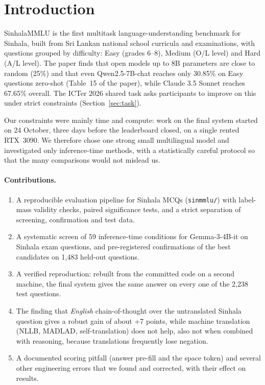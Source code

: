\documentclass[10pt,a4paper]{article}
\begin{document}
\tableofcontents
\newpage

\section{Introduction}
SinhalaMMLU \cite{pramodya2025} is the first multitask language-understanding benchmark for Sinhala, built from Sri
Lankan national school curricula and examinations, with questions grouped by difficulty: Easy (grades 6--8),
Medium (O/L level) and Hard (A/L level). The paper finds that open models up to 8B parameters are close to random
(25\%) and that even Qwen2.5-7B-chat reaches only 30.85\% on Easy questions zero-shot (Table~15 of the paper), while
Claude 3.5 Sonnet reaches 67.65\% overall. The ICTer 2026 shared task asks participants to improve on this under
strict constraints (Section~\ref{sec:task}).

Our constraints were mainly time and compute: work on the final system started on 24 October, three days before the
leaderboard closed, on a single rented RTX~3090. We therefore chose one strong small multilingual model and
investigated only inference-time methods, with a statistically careful protocol so that the many comparisons
would not mislead us.

\paragraph{Contributions.}
\begin{enumerate}
\item A reproducible evaluation pipeline for Sinhala MCQs (\texttt{sinmmlu/}) with label-mass validity checks,
paired significance tests, and a strict separation of screening, confirmation and test data.
\item A systematic screen of 59 inference-time conditions for Gemma-3-4B-it on Sinhala exam questions, and
pre-registered confirmations of the best candidates on 1,483 held-out questions.
\item A verified reproduction: rebuilt from the committed code on a second machine, the final system gives the same
answer on every one of the 2,238 test questions.
\item The finding that \emph{English} chain-of-thought over the untranslated Sinhala question gives a robust gain
of about +7 points, while machine translation (NLLB, MADLAD, self-translation) does not help, also not when combined
with reasoning, because translations frequently lose negation.
\item A documented scoring pitfall (answer pre-fill and the space token) and several other engineering errors
that we found and corrected, with their effect on results.
\end{enumerate}
\end{document}
